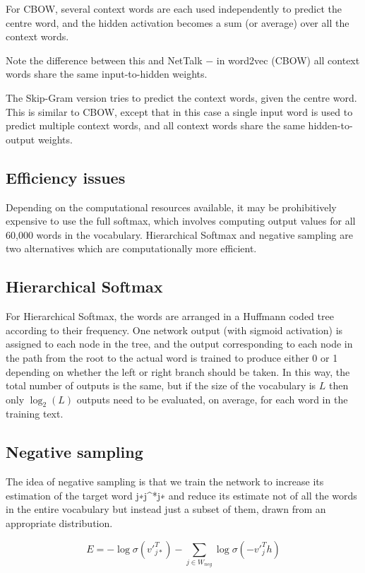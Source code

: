 \documentclass[11pt]{article}
\begin{document}
For CBOW, several context words are each used independently to predict the
centre word, and the hidden activation becomes a sum (or average) over all the
context words.

Note the difference between this and NetTalk $-$ in word2vec (CBOW) all context
words share the same input-to-hidden weights.

The Skip-Gram version tries to predict the context words, given the centre
word.
This is similar to CBOW, except that in this case a single input word is used
to predict multiple context words, and all context words share the same
hidden-to-output weights.

\subsection{Efficiency issues}\label{subsec:efficiency-issues}
Depending on the computational resources available, it may be prohibitively
expensive to use the full softmax, which involves computing output values for
all 60,000 words in the vocabulary.
Hierarchical Softmax and negative sampling are two alternatives which are
computationally more efficient.

\subsection{Hierarchical Softmax}\label{subsec:hierarchical-softmax}
For Hierarchical Softmax, the words are arranged in a Huffmann coded tree
according to their frequency.
One network output (with sigmoid activation) is assigned to each node in the
tree, and the output corresponding to each node in the path from the root to
the actual word is trained to produce either 0 or 1 depending on whether the
left or right branch should be taken.
In this way, the total number of outputs is the same, but if the size of the
vocabulary is $L$ then only $\log_2(L)$ outputs need to be evaluated, on
average, for each word in the training text.

\subsection{Negative sampling}\label{subsec:negative-sampling}
The idea of negative sampling is that we train the network to increase its
estimation of the target word j∗j^*j∗ and reduce its estimate not of all the
words in the entire vocabulary but instead just a subset of them, drawn from an
appropriate distribution.

\[E = -\log \sigma(v'_{j*}^T) - \sum_{j \in W_{neg}} \log \sigma (-v'_{j}^{T}h)\]
\end{document}
